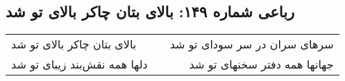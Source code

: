 \begin{center}
\section*{رباعی شماره ۱۴۹: بالای بتان چاکر بالای تو شد}
\label{sec:sh149}
\begin{longtable}{l p{0.5cm} r}
بالای بتان چاکر بالای تو شد
&&
سرهای سران در سر سودای تو شد
\\
دلها همه نقش‌بند زیبای تو شد
&&
جهانها همه دفتر سخنهای تو شد
\\
\end{longtable}
\end{center}
